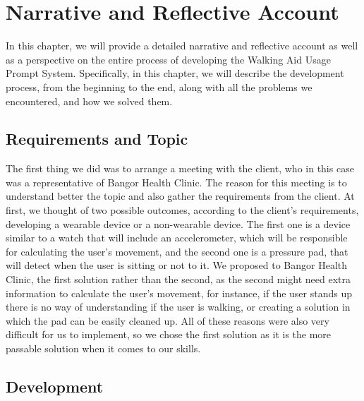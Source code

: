 \chapter{Narrative and Reflective Account}
\label{ch:narrative}

    In this chapter, we will provide a detailed narrative and reflective account as well as a perspective on the entire process of developing the Walking Aid Usage Prompt System. Specifically, in this chapter, we will describe the development process, from the beginning to the end, along with all the problems we encountered, and how we solved them.

    \section{Requirements and Topic}
    \label{sec:reqs}

    The first thing we did was to arrange a meeting with the client, who in this case was a representative of Bangor Health Clinic. The reason for this meeting is to understand better the topic and also gather the requirements from the client. At first, we thought of two possible outcomes, according to the client's requirements, developing a wearable device or a non-wearable device. The first one is a device similar to a watch that will include an accelerometer, which will be responsible for calculating the user's movement, and the second one is a pressure pad, that will detect when the user is sitting or not to it. We proposed to Bangor Health Clinic, the first solution rather than the second, as the second might need extra information to calculate the user's movement, for instance, if the user stands up there is no way of understanding if the user is walking, or creating a solution in which the pad can be easily cleaned up. All of these reasons were also very difficult for us to implement, so we chose the first solution as it is the more passable solution when it comes to our skills.

    \section{Development}
    \label{sec:development}

